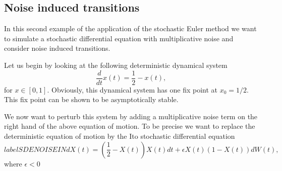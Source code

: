 \subsection{Noise induced transitions}
In this second example of the application of the stochastic Euler 
method we want to simulate a stochastic differential equation with
multiplicative noise and consider noise induced transitions.

Let us begin by looking at the following deterministic dynamical 
system
\begin{equation*}
\frac{d}{dt} x(t) = \frac{1}{2} - x(t),
\end{equation*}
for $x \in [0,1]$. Obviously, this dynamical system has one 
fix point at $x_0=1/2$. This fix point can be shown to be 
asymptotically stable. 

We now want to perturb this system by adding a multiplicative 
noise term on the right hand of the above equation of motion.
To be precise we want to replace the deterministic equation of 
motion by the Ito stochastic differential equation
\begin{equation}
label{SDENOISEIN}
dX(t) = (\frac{1}{2} - X(t))X(t)dt + \epsilon X(t) (1-X(t)) dW(t),
\end{equation}
where $\epsilon <0$

